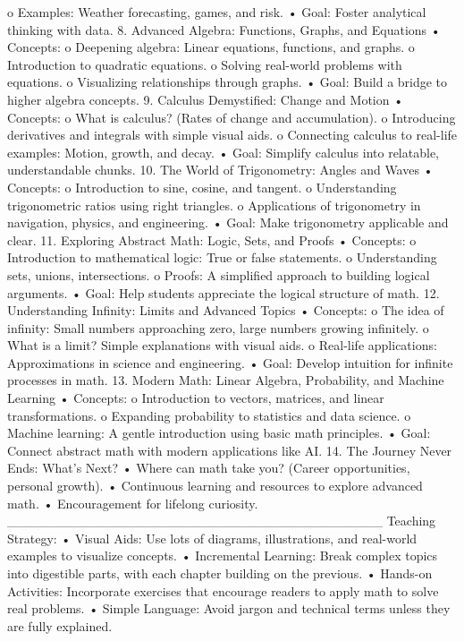o	Examples: Weather forecasting, games, and risk.
•	Goal: Foster analytical thinking with data.
8. Advanced Algebra: Functions, Graphs, and Equations
•	Concepts:
o	Deepening algebra: Linear equations, functions, and graphs.
o	Introduction to quadratic equations.
o	Solving real-world problems with equations.
o	Visualizing relationships through graphs.
•	Goal: Build a bridge to higher algebra concepts.
9. Calculus Demystified: Change and Motion
•	Concepts:
o	What is calculus? (Rates of change and accumulation).
o	Introducing derivatives and integrals with simple visual aids.
o	Connecting calculus to real-life examples: Motion, growth, and decay.
•	Goal: Simplify calculus into relatable, understandable chunks.
10. The World of Trigonometry: Angles and Waves
•	Concepts:
o	Introduction to sine, cosine, and tangent.
o	Understanding trigonometric ratios using right triangles.
o	Applications of trigonometry in navigation, physics, and engineering.
•	Goal: Make trigonometry applicable and clear.
11. Exploring Abstract Math: Logic, Sets, and Proofs
•	Concepts:
o	Introduction to mathematical logic: True or false statements.
o	Understanding sets, unions, intersections.
o	Proofs: A simplified approach to building logical arguments.
•	Goal: Help students appreciate the logical structure of math.
12. Understanding Infinity: Limits and Advanced Topics
•	Concepts:
o	The idea of infinity: Small numbers approaching zero, large numbers growing infinitely.
o	What is a limit? Simple explanations with visual aids.
o	Real-life applications: Approximations in science and engineering.
•	Goal: Develop intuition for infinite processes in math.
13. Modern Math: Linear Algebra, Probability, and Machine Learning
•	Concepts:
o	Introduction to vectors, matrices, and linear transformations.
o	Expanding probability to statistics and data science.
o	Machine learning: A gentle introduction using basic math principles.
•	Goal: Connect abstract math with modern applications like AI.
14. The Journey Never Ends: What’s Next?
•	Where can math take you? (Career opportunities, personal growth).
•	Continuous learning and resources to explore advanced math.
•	Encouragement for lifelong curiosity.
________________________________________
Teaching Strategy:
•	Visual Aids: Use lots of diagrams, illustrations, and real-world examples to visualize concepts.
•	Incremental Learning: Break complex topics into digestible parts, with each chapter building on the previous.
•	Hands-on Activities: Incorporate exercises that encourage readers to apply math to solve real problems.
•	Simple Language: Avoid jargon and technical terms unless they are fully explained.
